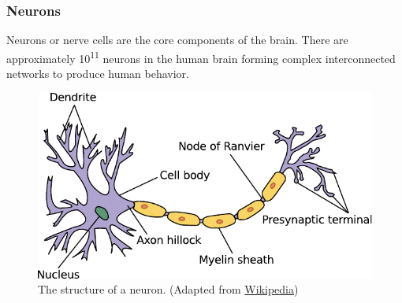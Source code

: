\documentclass[12pt]{article}
\newcommand\mysubsubsection[1]{\subsubsection{#1}}
\numberwithin{equation}{section}
\numberwithin{figure}{section}
\numberwithin{table}{section}
\begin{document}
\mysubsubsection{Neurons}\label{seq:neural_principles_neurons}

\par{
    Neurons or nerve cells are the core components of the brain. There are
    approximately 10\textsuperscript{11} neurons in the human brain \citep{kandel_principles_2013}
    forming complex interconnected networks to produce human behavior.

\begin{figure}[ht]
    \centering
    \includegraphics[scale=0.9]{images/neuron}
    \caption[The structure of a neuron.]{The structure of a neuron. (Adapted from \href{http://commons.wikimedia.org/wiki/File:Neuron.svg}{Wikipedia})}
    \label{fig:neuron}
\end{figure}
}
\end{document}
